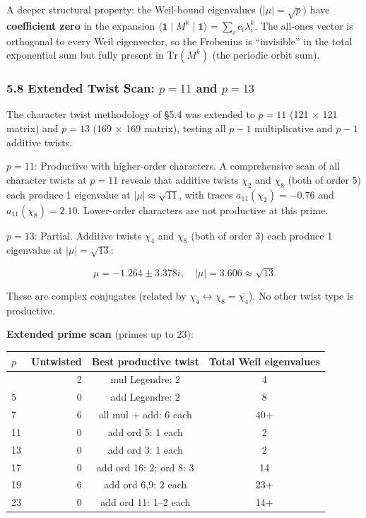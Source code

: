 \documentclass[
  11pt,
]{article}
\begin{document}
A deeper structural property: the Weil-bound eigenvalues
(\(\lvert\mu\rvert = \sqrt{p}\)) have \textbf{coefficient zero} in the expansion
\(\langle \boldsymbol{1} \mid M^k \mid \boldsymbol{1} \rangle = \sum_i c_i \lambda_i^k\).
The all-ones vector is orthogonal to every Weil eigenvector, so the Frobenius is
``invisible'' in the total exponential sum but fully present in
\(\mathrm{Tr}(M^k)\) (the periodic orbit sum).

\subsubsection{\texorpdfstring{5.8 Extended Twist Scan: \(p = 11\) and
\(p = 13\)}{5.8 Extended Twist Scan: p = 11 and p = 13}}\label{extended-twist-scan-p-11-and-p-13}

The character twist methodology of §5.4 was extended to \(p = 11\) (121 × 121
matrix) and \(p = 13\) (169 × 169 matrix), testing all \(p-1\) multiplicative
and \(p-1\) additive twists.

\(p = 11\): Productive with higher-order characters. A comprehensive scan of all
character twists at \(p = 11\) reveals that additive twists \(\chi_2\) and
\(\chi_8\) (both of order 5) each produce 1 eigenvalue at
\(\lvert\mu\rvert \approx \sqrt{11}\), with traces \(a_{11}(\chi_2) = -0.76\)
and \(a_{11}(\chi_8) = 2.10\). Lower-order characters are not productive at this
prime.

\(p = 13\): Partial. Additive twists \(\chi_4\) and \(\chi_8\) (both of order 3)
each produce 1 eigenvalue at \(\lvert\mu\rvert = \sqrt{13}\):

\[\mu = -1.264 \pm 3.378 i, \quad \lvert\mu\rvert = 3.606 \approx \sqrt{13}\]

These are complex conjugates (related by
\(\chi_4 \leftrightarrow \chi_8 = \overline{\chi_4}\)). No other twist type is
productive.

\textbf{Extended prime scan} (primes up to 23):

\begin{longtable}[]{@{}lrcc@{}}
\toprule\noalign{}
\(p\) & Untwisted & Best productive twist & Total Weil eigenvalues \\
\midrule\noalign{}
\endhead
\bottomrule\noalign{}
\endlastfoot
3 & 2 & mul Legendre: 2 & 4 \\
5 & 0 & add Legendre: 2 & 8 \\
7 & 6 & all mul + add: 6 each & 40+ \\
11 & 0 & add ord 5: 1 each & 2 \\
13 & 0 & add ord 3: 1 each & 2 \\
17 & 0 & add ord 16: 2; ord 8: 3 & 14 \\
19 & 6 & add ord 6,9: 2 each & 23+ \\
23 & 0 & add ord 11: 1--2 each & 14+ \\
\end{longtable}
\end{document}
